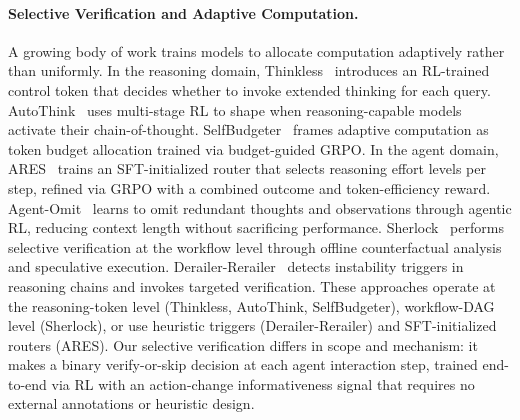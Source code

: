 \paragraph{Selective Verification and Adaptive Computation.}
A growing body of work trains models to allocate computation adaptively rather than uniformly. In the reasoning domain, Thinkless~\cite{du2025thinkless} introduces an RL-trained control token that decides whether to invoke extended thinking for each query. AutoThink~\cite{tu2025autothink} uses multi-stage RL to shape when reasoning-capable models activate their chain-of-thought. SelfBudgeter~\cite{selfbudgeter2026} frames adaptive computation as token budget allocation trained via budget-guided GRPO. In the agent domain, ARES~\cite{yang2026ares} trains an SFT-initialized router that selects reasoning effort levels per step, refined via GRPO with a combined outcome and token-efficiency reward. Agent-Omit~\cite{agent-omit2026} learns to omit redundant thoughts and observations through agentic RL, reducing context length without sacrificing performance. Sherlock~\cite{sherlock2025} performs selective verification at the workflow level through offline counterfactual analysis and speculative execution. Derailer-Rerailer~\cite{wan2025derailer-rerailer} detects instability triggers in reasoning chains and invokes targeted verification. These approaches operate at the reasoning-token level (Thinkless, AutoThink, SelfBudgeter), workflow-DAG level (Sherlock), or use heuristic triggers (Derailer-Rerailer) and SFT-initialized routers (ARES). Our selective verification differs in scope and mechanism: it makes a binary verify-or-skip decision at each agent interaction step, trained end-to-end via RL with an action-change informativeness signal that requires no external annotations or heuristic design.


